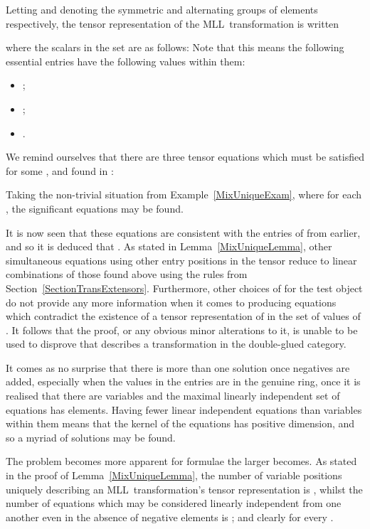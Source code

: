\documentclass{LMCS}
\theoremstyle{plain}\newtheorem*{cLm}{Claim}
\newcommand{\mll}{MLL} \newcommand{\mall}{MALL}
\newcommand{\p}{} \newcommand{\N}{\mathbb{N}}
\begin{document}
    Letting  and  denoting the symmetric and alternating groups of  elements respectively, the tensor representation of the \mll~transformation is written \vspace{2mm}
    
   where the scalars in the set  are as follows: \vspace{2mm}
     \vspace{2mm}
    Note that this means the following essential entries have the following values within them:
    \begin{itemize}
    \item ;
    \item ;
    \item .
    \end{itemize}
    \vspace{2mm}
    
    We remind ourselves that there are three tensor equations which must be satisfied for some ,  and  found in :
    \vspace{1mm}
    
  Taking the non-trivial situation from Example~\ref{MixUniqueExam}, where  for each , the significant equations may be found.
    
    It is now seen that these equations are consistent with the entries of  from earlier, and so it is deduced that . As stated in Lemma~\ref{MixUniqueLemma}, other simultaneous equations using other entry positions in the tensor  reduce to linear combinations of those found above using the rules from Section~\ref{SectionTransExtensors}. Furthermore, other choices of  for the test object  do not provide any more information when it comes to producing equations which contradict the existence of a tensor representation of  in the set of values of . It follows that the proof, or any obvious minor alterations to it, is unable to be used to disprove that  describes a transformation in the double-glued category.
    
    \p It comes as no surprise that there is more than one solution once negatives are added, especially when the values in the entries are in the genuine ring, once it is realised that there are  variables and the maximal linearly independent set of equations has  elements. Having fewer linear independent equations than variables within them means that the kernel of the equations has positive dimension, and so a myriad of solutions may be found.
    
    The problem becomes more apparent for formulae  the larger  becomes. As stated in the proof of Lemma~\ref{MixUniqueLemma}, the number of variable positions uniquely describing an \mll~transformation's tensor representation is , whilst the number of equations which may be considered linearly independent from one another even in the absence of negative elements is ; and clearly  for every .
    
\end{document}
